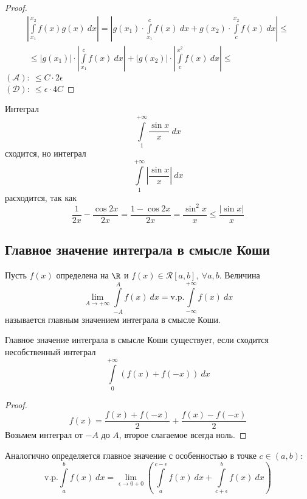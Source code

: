 \begin{proof}
    \begin{multline*}
        \left|\int\limits_{x_1}^{x_2}f(x)g(x)\ dx\right|=\left|g(x_1)\cdot \int\limits_{x_1}^{c}f(x)\ dx+g(x_2)\cdot \int\limits_{c}^{x_2}f(x)\ dx\right|\leq\\\
        \leq |g(x_1)|\cdot \left|\int\limits_{x_1}^{c}f(x)\ dx\right|+|g(x_2)|\cdot \left|\int\limits_{c}^{x^2}f(x)\ dx\right|\leq
    \end{multline*} 
    $(\mathcal{A}):\ \leq C\cdot 2\epsilon$\\
    $(\mathcal{D}):\ \leq \epsilon \cdot 4C$
\end{proof} 
\begin{example} Интеграл 
    \[\int\limits_{1}^{+\infty}\frac{\sin{x}}{x}\ dx\]
    сходится, но интеграл
    \[\int\limits_{1}^{+\infty}\left|\frac{\sin{x}}{x}\right|\ dx\]
    расходится, так как
    \[\frac{1}{2x}-\frac{\cos{2x}}{2x}=\frac{1-\cos{2x}}{2x}=\frac{\sin^2{x}}{x}\leq \frac{|\sin{x}|}{x}\]
\end{example}
\subsection{Главное значение интеграла в смысле Коши}
\begin{definition}
    Пусть $f(x)$ определена на $\R$ и $f(x)\in \mathcal{R}[a,b],\ \forall a,b$. Величина
    \[\lim\limits_{A\to +\infty}\int\limits_{-A}^{A}f(x)\ dx=\text{v.p.} \int\limits_{-\infty}^{+\infty}f(x)\ dx\]
    называется главным значением интеграла в смысле Коши. %
\end{definition} 
\begin{theorem}
    Главное значение интеграла в смысле Коши существует, если сходится несобственный интеграл
    \[\int\limits_{0}^{+\infty}(f(x)+f(-x))\ dx\]
\end{theorem} 
\begin{proof}
    \[f(x)=\frac{f(x)+f(-x)}{2}+\frac{f(x)-f(-x)}{2}\]
    Возьмем интеграл от $-A$ до $A$, второе слагаемое всегда ноль.
\end{proof} 
\begin{comm}
    Аналогично определяется главное значение с особенностью в точке $c\in (a,b)$:
    \[\text{v.p.}\int\limits_{a}^{b}f(x)\ dx=\lim\limits_{\epsilon\to 0+0}\left(\int\limits_{a}^{c-\epsilon}f(x)\ dx+\int\limits_{c+\epsilon}^{b}f(x)\ dx\right)\]
\end{comm} 